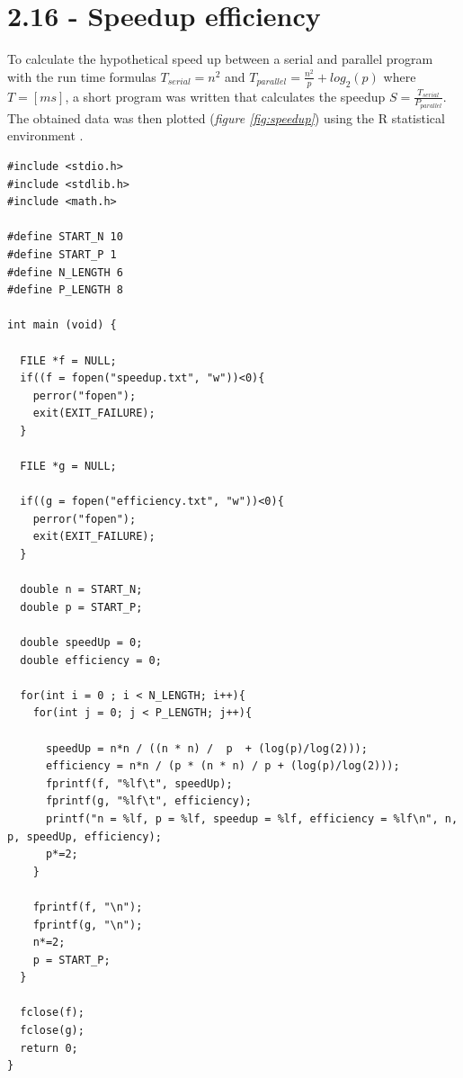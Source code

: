 \documentclass[a4paper,11pt,twoside]{article}
\begin{document}
    
\section{2.16 - Speedup efficiency}
To calculate the hypothetical speed up between a serial and parallel program with the run time formulas $T_{serial}=n^{2}$ and $T_{parallel} = \frac{n^{2}}{p}+log_{2}(p)$ where $T=[ms]$, a short program was written that calculates the speedup $S=\frac{T_{serial}}{P_{parallel}}$. The obtained data was then plotted (\textit{figure \ref{fig:speedup}}) using the R statistical environment \cite{rlanguage}.

\begin{verbatim}
#include <stdio.h>
#include <stdlib.h>
#include <math.h>

#define START_N 10
#define START_P 1
#define N_LENGTH 6
#define P_LENGTH 8

int main (void) {
  
  FILE *f = NULL;
  if((f = fopen("speedup.txt", "w"))<0){
    perror("fopen");
    exit(EXIT_FAILURE);
  }

  FILE *g = NULL;

  if((g = fopen("efficiency.txt", "w"))<0){
    perror("fopen");
    exit(EXIT_FAILURE);
  }

  double n = START_N;
  double p = START_P;

  double speedUp = 0;
  double efficiency = 0;

  for(int i = 0 ; i < N_LENGTH; i++){
    for(int j = 0; j < P_LENGTH; j++){

      speedUp = n*n / ((n * n) /  p  + (log(p)/log(2)));
      efficiency = n*n / (p * (n * n) / p + (log(p)/log(2))); 
      fprintf(f, "%lf\t", speedUp);
      fprintf(g, "%lf\t", efficiency);
      printf("n = %lf, p = %lf, speedup = %lf, efficiency = %lf\n", n, p, speedUp, efficiency);
      p*=2;
    }

    fprintf(f, "\n");
    fprintf(g, "\n");
    n*=2;
    p = START_P;
  }

  fclose(f);
  fclose(g);
  return 0;
}
\end{verbatim}
\end{document}

